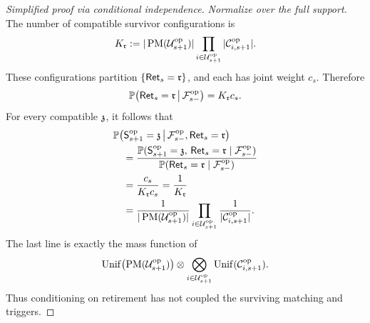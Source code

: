 {\begin{proof}[Simplified proof via conditional independence]
\emph{Normalize over the full support.}
The number of compatible survivor configurations is
\[
 K_{\mathfrak r}
 :=|\operatorname{PM}(\mathcal U^{\mathrm{op}}_{s+1})|
 \prod_{i\in\mathcal U^{\mathrm{op}}_{s+1}}
   |\mathcal C^{\mathrm{op}}_{i,s+1}|.
\]
These configurations partition
\(\{\mathsf{Ret}_{s}=\mathfrak r\}\), and each has joint
weight \(c_s\).  Therefore
\[
 \mathbb P\!\left(
   \mathsf{Ret}_{s}=\mathfrak r
   \,\middle|\,\mathcal F^{\mathrm{op}}_{s-}\right)
 =K_{\mathfrak r}c_s.
\]
For every compatible \(\mathfrak z\), it follows that
\begin{align*}
 &\mathbb P\!\left(
   \mathsf S^{\mathrm{op}}_{s+1}=\mathfrak z
   \,\middle|\,
   \mathcal F^{\mathrm{op}}_{s-},\mathsf{Ret}_{s}=\mathfrak r\right)\\
 &\quad=
 \frac{
  \mathbb P(
   \mathsf S^{\mathrm{op}}_{s+1}=\mathfrak z,\,
   \mathsf{Ret}_{s}=\mathfrak r
   \mid\mathcal F^{\mathrm{op}}_{s-})}
 {\mathbb P(
   \mathsf{Ret}_{s}=\mathfrak r
   \mid\mathcal F^{\mathrm{op}}_{s-})}\\
 &\quad=
 \frac{c_s}{K_{\mathfrak r}c_s}
 =\frac{1}{K_{\mathfrak r}}\\
 &\quad=
 \frac{1}{|\operatorname{PM}(\mathcal U^{\mathrm{op}}_{s+1})|}
 \prod_{i\in\mathcal U^{\mathrm{op}}_{s+1}}
       \frac{1}{|\mathcal C^{\mathrm{op}}_{i,s+1}|}.
\end{align*}
The last line is exactly the mass function of
\[
 \operatorname{Unif}\bigl(
   \operatorname{PM}(\mathcal U^{\mathrm{op}}_{s+1})\bigr)
 \otimes
 \bigotimes_{i\in\mathcal U^{\mathrm{op}}_{s+1}}
   \operatorname{Unif}(\mathcal C^{\mathrm{op}}_{i,s+1}).
\]
Thus conditioning on retirement has not coupled the surviving matching and
triggers.


\end{proof}}
